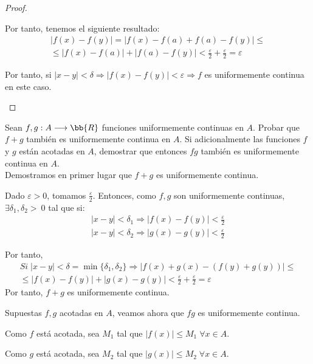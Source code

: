 \begin{proof}
\begin{enumerate}
        Por tanto, tenemos el siguiente resultado:
        \begin{multline*}
            |f(x)-f(y)| = |f(x)-f(a)+f(a) - f(y)| 
            \leq \\ \leq 
            |f(x)-f(a)| + |f(a) - f(y)| < \frac{\varepsilon}{2} + \frac{\varepsilon}{2} = \varepsilon
        \end{multline*}

        Por tanto, si $|x-y|<\delta \Longrightarrow |f(x)-f(y)| < \varepsilon \Longrightarrow f$ es uniformemente continua en este caso.
    \end{enumerate}
\end{proof}

\begin{ejercicio} Sean $f,g:A\longrightarrow \bb{R}$ funciones uniformemente continuas en $A$. Probar que $f+g$ también es uniformemente continua en $A$. Si adicionalmente las funciones $f$ y $g$ están acotadas en $A$, demostrar que entonces $fg$ también es uniformemente continua en $A$.\\

Demostramos en primer lugar que $f+g$ es uniformemente continua.

Dado $\varepsilon>0$, tomamos $\frac{\varepsilon}{2}$. Entonces, como $f,g$ son uniformemente continuas, $\exists \delta_1,\delta_2>~0$ tal que si:
\begin{equation*}
    \begin{array}{l}
        |x-y| < \delta_1 \Longrightarrow |f(x) - f(y)| < \frac{\varepsilon}{2} \\
        |x-y| < \delta_2 \Longrightarrow |g(x) - g(y)| < \frac{\varepsilon}{2} 
    \end{array}
\end{equation*}

Por tanto,
\begin{multline*}
    Si\; |x-y| < \delta = \min\{\delta_1, \delta_2\} \Longrightarrow |f(x)+g(x) - (f(y) + g(y))| \leq \\
    \leq |f(x)-f(y)| + |g(x)-g(y)| <  \frac{\varepsilon}{2} + \frac{\varepsilon}{2} = \varepsilon
\end{multline*}
Por tanto, $f+g$ es uniformemente continua.

Supuestas $f,g$ acotadas en $A$, veamos ahora que $fg$ es uniformemente continua.

Como $f$ está acotada, sea $M_1$ tal que $|f(x)| \leq M_1\; \forall x\in A$.

Como $g$ está acotada, sea $M_2$ tal que $|g(x)| \leq M_2\; \forall x\in A$.\\



\end{ejercicio}
